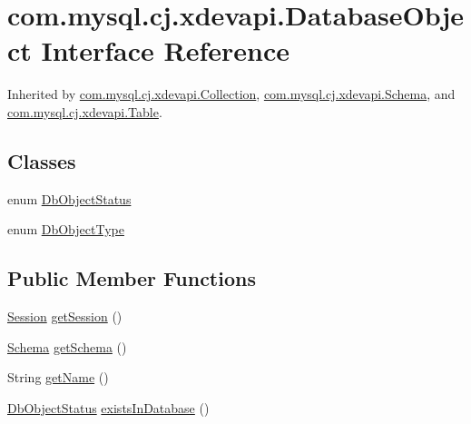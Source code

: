 \hypertarget{interfacecom_1_1mysql_1_1cj_1_1xdevapi_1_1_database_object}{}\section{com.\+mysql.\+cj.\+xdevapi.\+Database\+Object Interface Reference}
\label{interfacecom_1_1mysql_1_1cj_1_1xdevapi_1_1_database_object}


Inherited by \mbox{\hyperlink{interfacecom_1_1mysql_1_1cj_1_1xdevapi_1_1_collection}{com.\+mysql.\+cj.\+xdevapi.\+Collection}}, \mbox{\hyperlink{interfacecom_1_1mysql_1_1cj_1_1xdevapi_1_1_schema}{com.\+mysql.\+cj.\+xdevapi.\+Schema}}, and \mbox{\hyperlink{interfacecom_1_1mysql_1_1cj_1_1xdevapi_1_1_table}{com.\+mysql.\+cj.\+xdevapi.\+Table}}.

\subsection*{Classes}
\begin{DoxyCompactItemize}
\item 
enum \mbox{\hyperlink{enumcom_1_1mysql_1_1cj_1_1xdevapi_1_1_database_object_1_1_db_object_status}{Db\+Object\+Status}}
\item 
enum \mbox{\hyperlink{enumcom_1_1mysql_1_1cj_1_1xdevapi_1_1_database_object_1_1_db_object_type}{Db\+Object\+Type}}
\end{DoxyCompactItemize}
\subsection*{Public Member Functions}
\begin{DoxyCompactItemize}
\item 
\mbox{\hyperlink{interfacecom_1_1mysql_1_1cj_1_1xdevapi_1_1_session}{Session}} \mbox{\hyperlink{interfacecom_1_1mysql_1_1cj_1_1xdevapi_1_1_database_object_a0bebc7132108a9cfcffed4a599b2dad5}{get\+Session}} ()
\item 
\mbox{\hyperlink{interfacecom_1_1mysql_1_1cj_1_1xdevapi_1_1_schema}{Schema}} \mbox{\hyperlink{interfacecom_1_1mysql_1_1cj_1_1xdevapi_1_1_database_object_a2d3d1b87950c42ecbe557248c51c954b}{get\+Schema}} ()
\item 
String \mbox{\hyperlink{interfacecom_1_1mysql_1_1cj_1_1xdevapi_1_1_database_object_a482b3ae6f40ec6332bb7d8d8d02d1dda}{get\+Name}} ()
\item 
\mbox{\hyperlink{enumcom_1_1mysql_1_1cj_1_1xdevapi_1_1_database_object_1_1_db_object_status}{Db\+Object\+Status}} \mbox{\hyperlink{interfacecom_1_1mysql_1_1cj_1_1xdevapi_1_1_database_object_ab4215a82b546a9e1dcb344c339765d7a}{exists\+In\+Database}} ()
\end{DoxyCompactItemize}


